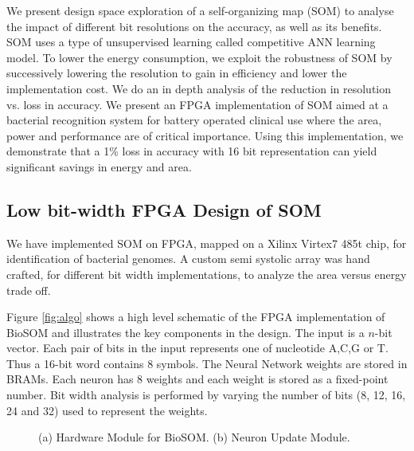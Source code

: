 \documentclass[a4paper,10pt]{article}
\begin{document}
We present design space exploration of a self-organizing map (SOM) to analyse the impact of different bit resolutions on the accuracy, as well as its benefits. SOM uses a type of unsupervised learning called competitive ANN learning model. To lower the energy consumption, we exploit the robustness of SOM by successively lowering the resolution to gain in efficiency and lower the implementation cost. We do an in depth analysis of the reduction in resolution vs. loss in accuracy. We present an FPGA implementation of SOM aimed at a bacterial recognition system for battery operated clinical use where the area, power and performance are of critical importance. Using this implementation, we demonstrate that a 1\% loss in accuracy with 16 bit representation can yield significant savings in energy and area.

\subsection{Low bit-width FPGA Design of SOM}
We have implemented SOM on FPGA, mapped on a Xilinx Virtex7 485t chip, for identification of bacterial genomes. A custom semi systolic array was hand crafted, for different bit width implementations, to analyze the area versus energy trade off.

Figure \ref{fig:algo} shows a high level schematic of the FPGA implementation of BioSOM and illustrates the key components in the design. The input is a $n$-bit vector. Each pair of bits in the input represents one of nucleotide A,C,G or T. Thus a 16-bit word contains 8 symbols.  The Neural Network weights are stored in BRAMs. Each neuron has 8 weights and each weight is stored as a fixed-point number. Bit width analysis is performed by varying the number of bits (8, 12, 16, 24 and 32) used to represent the weights.

\begin{figure}[!htb]
	\centering
    \captionsetup{font=sf}
	\hfil
	\caption{(a) Hardware Module for BioSOM. (b) Neuron Update Module.}	\label{fig:SOMFPGAImplementation}
\end{figure}
\end{document}
